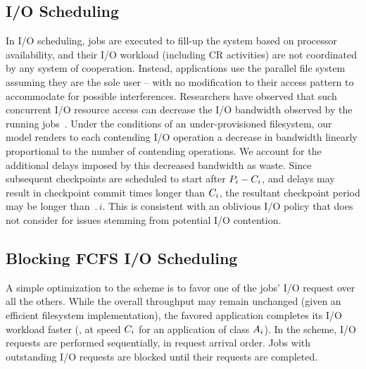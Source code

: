 \subsection{\nocoop I/O Scheduling}

In \nocoop I/O scheduling, jobs are executed to fill-up the system based on processor
availability, and their I/O workload (including CR activities) are not coordinated by
any system of cooperation.  Instead, applications use the parallel file system
assuming they are the sole user -- with no modification to their access pattern to
accommodate for possible interferences. Researchers have observed that such
concurrent I/O resource access can decrease the I/O bandwidth observed by the running
jobs~\cite{Dorier2015}.  Under the conditions of an under-provisioned filesystem, our
model renders to each contending I/O operation a decrease in bandwidth linearly
proportional to the number of contending operations.  We account for the additional
delays imposed by this decreased bandwidth as waste. Since subsequent checkpoints are
scheduled to start after $P_{i}-C_{i}$, and delays may result in checkpoint
commit times longer than $C_{i}$, the resultant checkpoint period may be longer
than $\period{i}$. This is consistent with an oblivious I/O policy that does not
consider for issues stemming from potential I/O contention.



\subsection{Blocking \fifoblock FCFS I/O Scheduling}
\label{sec:fcfsblock}

A simple optimization to the \nocoop scheme is to favor one of the jobs' I/O request
over all the others. While the overall throughput may remain unchanged (given an
efficient filesystem implementation), the favored application completes its I/O
workload faster (\ie, at speed $C_{i}$ for an application of class $A_{i}$).  In
the \fifoblock scheme, I/O requests are performed sequentially, in request arrival
order. Jobs with outstanding I/O requests are blocked until their requests are
completed.

